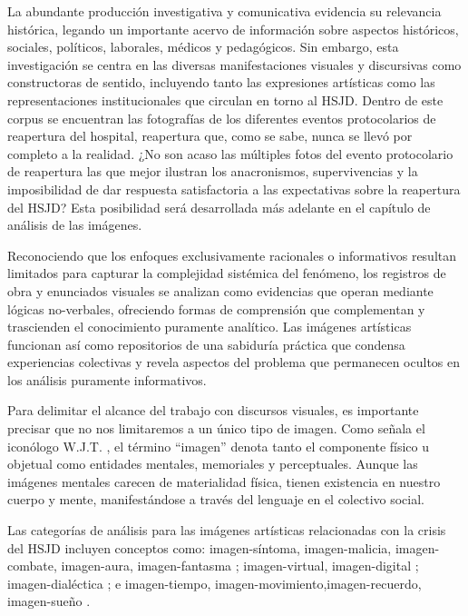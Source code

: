 La abundante producción investigativa y comunicativa evidencia su relevancia histórica, legando un importante acervo de información sobre aspectos históricos, sociales, políticos, laborales, médicos y pedagógicos. Sin embargo, esta investigación se centra en las diversas manifestaciones visuales y discursivas como constructoras de sentido, incluyendo tanto las expresiones artísticas como las representaciones institucionales que circulan en torno al HSJD. Dentro de este corpus se encuentran las fotografías de los diferentes eventos protocolarios de reapertura del hospital, reapertura que, como se sabe, nunca se llevó por completo a la realidad. ¿No son acaso las múltiples fotos del evento protocolario de reapertura las que mejor ilustran los anacronismos, supervivencias y la imposibilidad de dar respuesta satisfactoria a las expectativas sobre la reapertura del HSJD? Esta posibilidad será desarrollada más adelante en el capítulo de análisis de las imágenes.

Reconociendo que los enfoques exclusivamente racionales o informativos resultan limitados para capturar la complejidad sistémica del fenómeno, los registros de obra y enunciados visuales se analizan como evidencias que operan mediante lógicas no-verbales, ofreciendo formas de comprensión que complementan y trascienden el conocimiento puramente analítico. Las imágenes artísticas funcionan así como repositorios de una sabiduría práctica que condensa experiencias colectivas y revela aspectos del problema que permanecen ocultos en los análisis puramente informativos. 

Para delimitar el alcance del trabajo con discursos visuales, es importante precisar que no nos limitaremos a un único tipo de imagen. Como señala el iconólogo W.J.T. \parencite{Mitchell2005}, el término ``imagen'' denota tanto el componente físico u objetual como entidades mentales, memoriales y perceptuales. Aunque las imágenes mentales carecen de materialidad física, tienen existencia en nuestro cuerpo y mente, manifestándose a través del lenguaje en el colectivo social.

Las categorías de análisis para las imágenes artísticas relacionadas con la crisis del HSJD incluyen conceptos como: imagen-síntoma, imagen-malicia, imagen-combate, imagen-aura, imagen-fantasma \parencite{DidiHuberman2011}; imagen-virtual, imagen-digital \parencite{Manovich2005}; imagen-dialéctica \parencite{Benjamin2004}; e imagen-tiempo, imagen-movimiento,\linebreak[0] imagen-recuerdo, imagen-sueño \parencite{Deleuze1985}.

